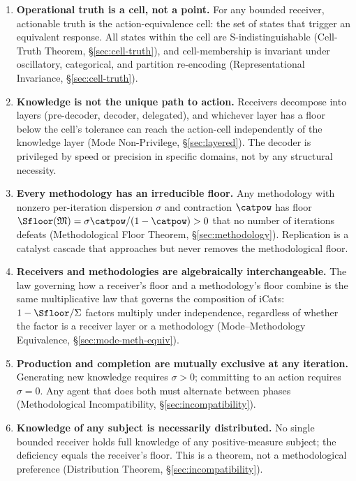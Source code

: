 \begin{enumerate}[label=(\arabic*), itemsep=4pt]

\item \textbf{Operational truth is a cell, not a point.} For any bounded receiver, actionable truth is the action-equivalence cell: the set of states that trigger an equivalent response. All states within the cell are S-indistinguishable (Cell-Truth Theorem, \S\ref{sec:cell-truth}), and cell-membership is invariant under oscillatory, categorical, and partition re-encoding (Representational Invariance, \S\ref{sec:cell-truth}).

\item \textbf{Knowledge is not the unique path to action.} Receivers decompose into layers (pre-decoder, decoder, delegated), and whichever layer has a floor below the cell's tolerance can reach the action-cell independently of the knowledge layer (Mode Non-Privilege, \S\ref{sec:layered}). The decoder is privileged by speed or precision in specific domains, not by any structural necessity.

\item \textbf{Every methodology has an irreducible floor.} Any methodology with nonzero per-iteration dispersion $\sigma$ and contraction $\catpow$ has floor $\Sfloor(\Meth) = \sigma\catpow/(1-\catpow) > 0$ that no number of iterations defeats (Methodological Floor Theorem, \S\ref{sec:methodology}). Replication is a catalyst cascade that approaches but never removes the methodological floor.

\item \textbf{Receivers and methodologies are algebraically interchangeable.} The law governing how a receiver's floor and a methodology's floor combine is the same multiplicative law that governs the composition of iCats: $1 - \Sfloor/\Sigma$ factors multiply under independence, regardless of whether the factor is a receiver layer or a methodology (Mode--Methodology Equivalence, \S\ref{sec:mode-meth-equiv}).

\item \textbf{Production and completion are mutually exclusive at any iteration.} Generating new knowledge requires $\sigma > 0$; committing to an action requires $\sigma = 0$. Any agent that does both must alternate between phases (Methodological Incompatibility, \S\ref{sec:incompatibility}).

\item \textbf{Knowledge of any subject is necessarily distributed.} No single bounded receiver holds full knowledge of any positive-measure subject; the deficiency equals the receiver's floor. This is a theorem, not a methodological preference (Distribution Theorem, \S\ref{sec:incompatibility}).

\end{enumerate}

